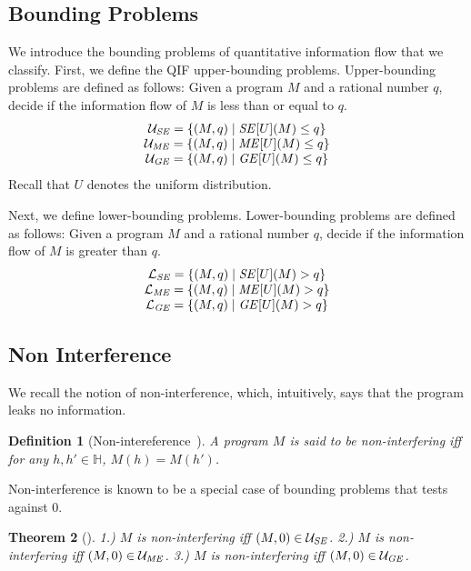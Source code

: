 \documentclass[]{eptcs}
\newcommand{\aset}[1]{\{{#1}\}}
\newtheorem{theorem}{Theorem}[section]
\newtheorem{definition}[theorem]{Definition}
\begin{document}
\subsection{Bounding Problems}
\label{subsec:bp}
We introduce the bounding problems of quantitative information flow
that we classify.  First, we define the QIF upper-bounding problems.
Upper-bounding problems are defined as follows: Given a program $M$
and a rational number $q$, decide if the information flow of $M$ is
less than or equal to $q$.
\[
\begin{array}{c}
  {\mathcal U}_{\it SE}=\aset{(M,q)\mid {\it SE}[U](M)\le q}\\
  {\mathcal U}_{\it ME}=\aset{(M,q)\mid {\it ME}[U](M)\le q}\\
  {\mathcal U}_{\it GE}=\aset{(M,q)\mid {\it GE}[U](M)\le q}
\end{array}
\]
Recall that $U$ denotes the uniform distribution.

Next, we define lower-bounding problems.  Lower-bounding problems are
defined as follows: Given a program $M$ and a rational number $q$,
decide if the information flow of $M$ is greater than $q$.
\[
\begin{array}{c}
  {\mathcal L}_{\it SE}=\aset{(M,q)\mid {\it SE}[U](M)> q}\\
  {\mathcal L}_{\it ME}=\aset{(M,q)\mid {\it ME}[U](M)> q}\\
  {\mathcal L}_{\it GE}=\aset{(M,q)\mid {\it GE}[U](M)> q}
\end{array}
\]

\subsection{Non Interference}

We recall the notion of non-interference, which, intuitively, says that
the program leaks no information.
\begin{definition}[Non-intereference~\cite{DBLP:conf/sosp/Cohen77,goguen:sp1982}]
  A program $M$ is said to be non-interfering iff for any $h,h'\in
  \mathbb{H}$, $M(h)=M(h')$.
\end{definition}

Non-interference is known to be a special case of bounding problems that
tests against $0$.
\begin{theorem}[\cite{clark05,DBLP:conf/esorics/YasuokaT10}]
\label{thm:nonint}
1.) $M$ is non-interfering iff $(M,0)\in\mathcal{U}_{\it SE}$.
2.) $M$ is non-interfering iff $(M,0)\in\mathcal{U}_{\it ME}$.
3.) $M$ is non-interfering iff $(M,0)\in\mathcal{U}_{\it GE}$.
\end{theorem}
\end{document}
